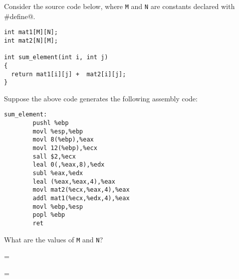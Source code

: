 \begin{problem}{8}

Consider the source code below, where {\tt M} and {\tt N} are
constants declared with \verb@#define@.

\begin{verbatim}
int mat1[M][N];
int mat2[N][M];

int sum_element(int i, int j)
{
  return mat1[i][j] +  mat2[i][j];
}  
\end{verbatim}
\begin{choice}
\item Suppose the above code generates the following 
assembly code:
\begin{verbatim}
sum_element:
        pushl %ebp
        movl %esp,%ebp
        movl 8(%ebp),%eax
        movl 12(%ebp),%ecx
        sall $2,%ecx
        leal 0(,%eax,8),%edx
        subl %eax,%edx
        leal (%eax,%eax,4),%eax
        movl mat2(%ecx,%eax,4),%eax
        addl mat1(%ecx,%edx,4),%eax
        movl %ebp,%esp
        popl %ebp
        ret
\end{verbatim}         

What are the values of {\tt M} and {\tt N}?       

\hspace{1cm}{\tt M} =

\vspace{.5cm}


\hspace{1cm}{\tt N} =

\vspace{1cm}

\end{choice}
\end{problem}
